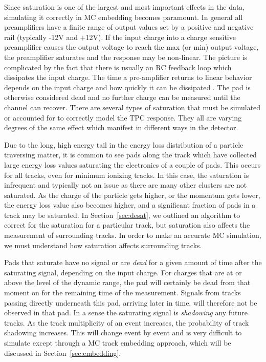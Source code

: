 Since saturation is one of the largest and most important effects in the data, simulating it correctly in MC embedding becomes paramount. In general all preamplifiers have a finite range of output values set by a positive and negative rail (typically -12V and +12V). If the input charge into a charge sensitive preamplifier causes the output voltage to reach the max (or min) output voltage, the preamplifier saturates and the response may be non-linear. The picture is complicated by the fact that there is usually an RC feedback loop which dissipates the input charge. The time a pre-amplifier returns to linear behavior depends on the input charge and how quickly it can be dissipated \cite{akiGET}. The pad is otherwise considered dead and no further charge can be measured until the channel can recover. There are several types of saturation that must be simulated or accounted for to correctly model the TPC response. They all are varying degrees of the same effect which manifest in different ways in the detector. 
 
Due to the long, high energy tail in  the energy loss distribution of a particle traversing matter, it is common to see pads along the track which have collected large energy loss values saturating the electronics of a couple of pads. This occurs for all tracks, even for minimum ionizing tracks. In this case, the saturation is infrequent and typically not an issue as there are many other clusters are not saturated. As the charge of the particle gets higher, or the momentum gets lower, the  energy loss value also becomes higher, and a significant fraction of pads in a track may be saturated. In Section~\ref{sec:desat}, we outlined an algorithm to correct for the saturation for a  particular track, but saturation also affects the measurement of surrounding tracks. In order to make an accurate MC simulation, we must understand how saturation affects surrounding tracks. 

Pads that saturate have no signal or are \emph{dead} for a given amount of time after the saturating signal, depending on the input charge. For charges that are at or above the level of the dynamic range, the pad will certainly be dead from that moment on for the remaining time of the measurement. Signals from tracks passing directly underneath this pad, arriving later in time,  will therefore not be observed in that pad. In a sense the saturating signal is \emph{shadowing} any future tracks. As the track multiplicity of an event increases, the probability of track shadowing increases. This will change event by event and is very difficult to simulate except through a MC track embedding approach, which will be discussed in Section~\ref{sec:embedding}. 

